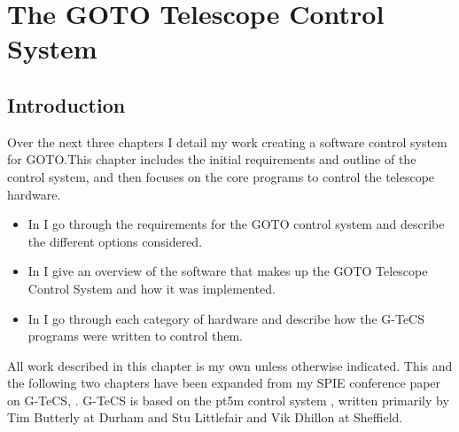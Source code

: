 \chapter{The GOTO Telescope Control System}
\label{chap:gtecs}
\chaptoc{}


\newpage
\section{Introduction}
\label{sec:gtecs_intro}
\begin{colsection}

Over the next three chapters I detail my work creating a software control system for GOTO.\@ This chapter includes the initial requirements and outline of the control system, and then focuses on the core programs to control the telescope hardware.
%
\begin{itemize}
    \item In  I go through the requirements for the GOTO control system and describe the different options considered.
    \item In  I give an overview of the software that makes up the GOTO Telescope Control System and how it was implemented.
    \item In  I go through each category of hardware and describe how the G-TeCS programs were written to control them.
\end{itemize}
%
All work described in this chapter is my own unless otherwise indicated. This and the following two chapters have been expanded from my SPIE conference paper on G-TeCS, \citet{Dyer}. G-TeCS is based on the pt5m control system \citep{pt5m}, written primarily by Tim Butterly at Durham and Stu Littlefair and Vik Dhillon at Sheffield.

\end{colsection}


\newpage
